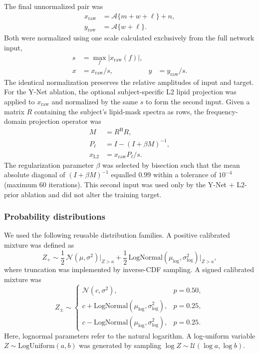 The final unnormalized pair was
\begin{align}
    x_{\mathrm{raw}} &= \mathcal{A}\{m+w+\ell\}+n,\\
    y_{\mathrm{raw}} &= \mathcal{A}\{w+\ell\}.
\end{align}
Both were normalized using one scale calculated exclusively from the full
network input,
\begin{align}
    s &= \max_f|x_{\mathrm{raw}}(f)|,\\
    x &= x_{\mathrm{raw}}/s, & y &= y_{\mathrm{raw}}/s.
    \label{eq:shared_normalization}
\end{align}
The identical normalization preserves the relative amplitudes of input and
target.  For the Y-Net ablation, the optional subject-specific L2 lipid
projection was applied to $x_{\mathrm{raw}}$ and normalized by the same $s$ to
form the second input.  Given a matrix $R$ containing the subject's lipid-mask
spectra as rows, the frequency-domain projection operator was
\begin{align}
    M &= R^{\mathrm H}R,\\
    P_{\ell} &= I-(I+\beta M)^{-1},\\
    x_{\mathrm{L2}} &= x_{\mathrm{raw}}P_{\ell}/s.
    \label{eq:l2_projection}
\end{align}
The regularization parameter $\beta$ was selected by bisection such that the
mean absolute diagonal of $(I+\beta M)^{-1}$ equalled $0.99$ within a tolerance
of $10^{-4}$ (maximum 60 iterations).  This second input was used only by the
Y-Net + L2-prior ablation and did not alter the training target.

\subsubsection{Probability distributions}

We used the following reusable distribution families.  A positive calibrated
mixture was defined as
\begin{equation}
    Z_+ \sim \frac{1}{2}\,\mathcal{N}(\mu,\sigma^2)\big|_{Z>a}
    +\frac{1}{2}\,\mathrm{LogNormal}(\mu_{\log},\sigma_{\log}^2)
      \big|_{Z>a},
    \label{eq:positive_mixture}
\end{equation}
where truncation was implemented by inverse-CDF sampling.  A signed calibrated
mixture was
\begin{equation}
    Z_{\pm}\sim
    \begin{cases}
      \mathcal{N}(c,\sigma^2),&p=0.50,\\
      c+\mathrm{LogNormal}(\mu_{\log},\sigma_{\log}^2),&p=0.25,\\
      c-\mathrm{LogNormal}(\mu_{\log},\sigma_{\log}^2),&p=0.25.
    \end{cases}
    \label{eq:symmetric_mixture}
\end{equation}
Here, lognormal parameters refer to the natural logarithm.  A log-uniform
variable $Z\sim\mathrm{LogUniform}(a,b)$ was generated by sampling
$\log Z\sim\mathcal{U}(\log a,\log b)$.

